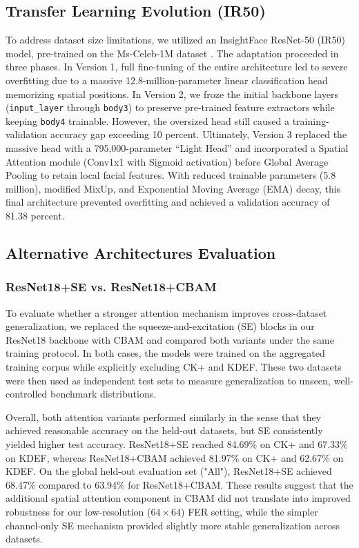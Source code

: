 \subsection{Transfer Learning Evolution (IR50)}
To address dataset size limitations, we utilized an InsightFace ResNet-50 (IR50) model, pre-trained on the Ms-Celeb-1M dataset \cite{wang2025qcsfeaturerefiningquadruplet}. The adaptation proceeded in three phases. In Version 1, full fine-tuning of the entire architecture led to severe overfitting due to a massive 12.8-million-parameter linear classification head memorizing spatial positions. In Version 2, we froze the initial backbone layers (\texttt{input\_layer} through \texttt{body3}) to preserve pre-trained feature extractors while keeping \texttt{body4} trainable. However, the oversized head still caused a training-validation accuracy gap exceeding 10 percent. Ultimately, Version 3 replaced the massive head with a 795,000-parameter ``Light Head'' and incorporated a Spatial Attention module (Conv1x1 with Sigmoid activation) before Global Average Pooling to retain local facial features. With reduced trainable parameters (5.8 million), modified MixUp, and Exponential Moving Average (EMA) decay, this final architecture prevented overfitting and achieved a validation accuracy of 81.38 percent.

\subsection{Alternative Architectures Evaluation}

\subsubsection{ResNet18+SE vs. ResNet18+CBAM}
To evaluate whether a stronger attention mechanism improves cross-dataset generalization, we replaced the squeeze-and-excitation (SE) blocks in our ResNet18 backbone with CBAM \cite{woo2018cbam} and compared both variants under the same training protocol. In both cases, the models were trained on the aggregated training corpus while explicitly excluding CK+ and KDEF. These two datasets were then used as independent test sets to measure generalization to unseen, well-controlled benchmark distributions.

Overall, both attention variants performed similarly in the sense that they achieved reasonable accuracy on the held-out datasets, but SE consistently yielded higher test accuracy. ResNet18+SE reached 84.69\% on CK+ and 67.33\% on KDEF, whereas ResNet18+CBAM achieved 81.97\% on CK+ and 62.67\% on KDEF. On the global held-out evaluation set ("All"), ResNet18+SE achieved 68.47\% compared to 63.94\% for ResNet18+CBAM. These results suggest that the additional spatial attention component in CBAM did not translate into improved robustness for our low-resolution ($64 \times 64$) FER setting, while the simpler channel-only SE mechanism provided slightly more stable generalization across datasets.

